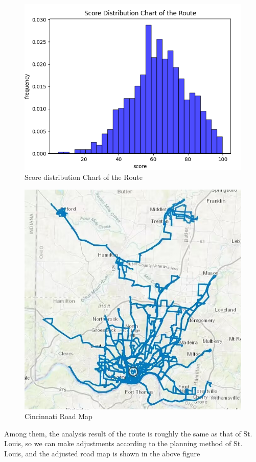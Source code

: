 \documentclass[12pt]{article}
\begin{document}
\begin{figure}[htbp]
	\qquad
	\begin{minipage}{0.49\linewidth}
		\centering
		\includegraphics[width=0.9\linewidth]{score x.png}
		\caption{Score distribution Chart of the Route}
		\label{score x.jpg}%
	\end{minipage}
\end{figure}
\newpage
\begin{figure}[htbp]
	\centering
	\begin{minipage}{0.49\linewidth}
		\centering
		\includegraphics[width=0.9\linewidth]{city x.jpg}
		\caption{Cincinnati Road Map}
		\label{city x.jpg}%
	\end{minipage}
\end{figure}
Among them, the analysis result of the route is roughly the same as that of St. Louis, so we can make adjustments according 
to the planning method of St. Louis, and the adjusted road map is shown in the above figure
\end{document}

